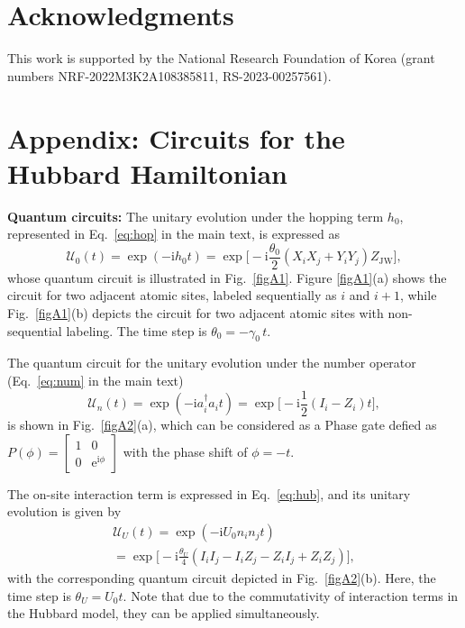 \documentclass[twocolumn,superscriptaddress,amsmath,amssymb,showpacs,floatfix,preprintnumbers]{revtex4-1}
\newcommand{\rmi}{\mathrm{i}}
\newcommand{\e}{\mathrm{e}}
\newcommand{\mc}{\mathcal}
\newcommand{\mr}{\mathrm}
\begin{document}
\section*{Acknowledgments}
This work is supported by the National Research Foundation
of Korea (grant numbers NRF-2022M3K2A108385811, RS-2023-00257561).

\section*{Appendix: Circuits for the Hubbard Hamiltonian} \label{append}

\textbf{Quantum circuits:} The unitary evolution under the hopping term $h_0$, represented in Eq.~\eqref{eq:hop} in the main text,
is expressed as
%
\begin{equation}
	\mc U_0(t) = \exp(-\rmi h_0 t) = \exp\Big[-\rmi \frac{\theta_0}{2}(X_i X_j + Y_i Y_j) Z_\mr{JW} \Big],
\end{equation}
%
whose quantum circuit is illustrated in Fig.~\ref{figA1}.
%
Figure \ref{figA1}(a) shows the circuit for two adjacent atomic sites, labeled 
sequentially as $i$ and $i+1$, while Fig.~\ref{figA1}(b) depicts the circuit for two adjacent 
atomic sites with non-sequential labeling.
%
The time step is $\theta_0 = -\gamma_0\, t$.

The quantum circuit for the unitary evolution under the number operator 
(Eq.~\eqref{eq:num} in the main text)
%
\begin{equation}
	\mc U_n(t) = \exp(-\rmi a^\dagger_{i} a_{i} t) = 
	\exp\big[-\rmi \frac{1}{2}(I_i - Z_i) t\big],
\end{equation}
%
is shown in Fig.~\ref{figA2}(a), which can be considered as a Phase gate defied as 
$
P(\phi) = \begin{bmatrix}
	1 & 0 \\
	0 & \e^{\rmi \phi}
\end{bmatrix}
$
with the phase shift of $\phi = - t$.

The on-site interaction term is expressed in Eq.~\eqref{eq:hub}, and its unitary evolution is given by 
%
\begin{multline}
	\mc U_U(t) = \exp(-\rmi U_0 n_{i} n_{j} t) \\
	= \exp\Big[-\rmi \frac{\theta_U}{4}(I_i I_j - I_i Z_j - Z_i I_j + Z_i Z_j)\Big],
\end{multline}
%
with the corresponding quantum circuit depicted in Fig.~\ref{figA2}(b).
Here, the time step is $\theta_U = U_0 t$.
%
Note that due to the commutativity of interaction terms in the Hubbard model, they can be applied
simultaneously.
\end{document}
